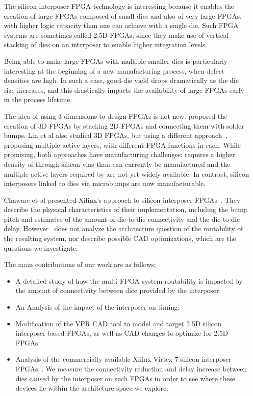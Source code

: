 \documentclass{sig-alternate-2013}
\begin{document}
The silicon interposer FPGA technology is interesting because it enables the creation of large FPGAs composed of small dies and also of very large FPGAs, with higher logic capacity than one can achieve with a single die. Such FPGA systems are sometimes called 2.5D FPGAs, since they make use of vertical stacking of dies on an interposer to enable higher integration levels.

Being able to make large FPGAs with multiple smaller dies is particularly interesting at the beginning of a new manufacturing process, when defect densities are high. In such a case, good-die yield drops dramatically as the die size increases, and this drastically impacts the availability of large FPGAs early in the process lifetime.

The idea of using 3 dimensions to design FPGAs is not new. \cite{3dfpga1995} proposed the creation of 3D FPGAs by stacking 2D FPGAs and connecting them with solder bumps. Lin et al also studied 3D FPGAs, but using a different approach~\cite{3dfpga}, proposing multiple active layers, with different FPGA functions in each. While promising, both approaches have manufacturing challenges: \cite{3dfpga1995} requires a higher density of through-silicon vias than can currently be manufactured and the multiple active layers required by \cite{3dfpga} are not yet widely available. In contrast, silicon interposers linked to dies via microbumps are now manufacturable.

Chaware et al presented Xilinx's approach to silicon interposer FPGAs~\cite{xilinxTSV}. They describe the physical characteristics of their implementation, including the bump pitch and estimates of the amount of die-to-die connectivity and the die-to-die delay. However~\cite{xilinxTSV} does not analyze the architecture question of the routability of the resulting system, nor describe possible CAD optimizations, which are the questions we investigate.

The main contributions of our work are as follows:
\begin{itemize}
	\item A detailed study of how the multi-FPGA system routability is impacted by the amount of connectivity between dice provided by the interposer.
	\item An Analysis of the impact of the interposer on timing.
	\item Modification of the VPR CAD tool to model and target 2.5D silicon interposer-based FPGAs, as well as CAD changes to optimize for 2.5D FPGAs.
	\item Analysis of the commercially available Xilinx Virtex-7 silicon interposer FPGAs~\cite{xilinxWP}\cite{xilinx7series}. We measure the connectivity reduction and delay increase between dies caused by the interposer on such FPGAs in order to see where these devices lie within the architcture space we explore.
\end{itemize}
\end{document}
